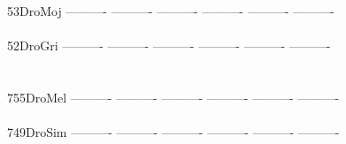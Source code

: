 \documentclass[11pt,twoside,reqno,a4paper]{article}
\begin{document}
{53\hspace*{3\charwidth}DroMoj	----------	----------	----------	----------	----------	----------	\\
\hspace*{5\charwidth}\hspace*{7\charwidth}\hspace*{1\charwidth}\hspace*{1\charwidth}\hspace*{1\charwidth}\hspace*{1\charwidth}\hspace*{1\charwidth}\hspace*{1\charwidth}\\
52\hspace*{3\charwidth}DroGri	----------	----------	----------	----------	----------	----------	\\
\hspace*{5\charwidth}\hspace*{7\charwidth}\hspace*{1\charwidth}\hspace*{1\charwidth}\hspace*{1\charwidth}\hspace*{1\charwidth}\hspace*{1\charwidth}\hspace*{1\charwidth}\\
\\
755\hspace*{2\charwidth}DroMel	----------	----------	----------	----------	----------	----------	\\
\hspace*{5\charwidth}\hspace*{7\charwidth}\hspace*{1\charwidth}\hspace*{1\charwidth}\hspace*{1\charwidth}\hspace*{1\charwidth}\hspace*{1\charwidth}\hspace*{1\charwidth}\\
749\hspace*{2\charwidth}DroSim	----------	----------	----------	----------	----------	----------	\\
\hspace*{5\charwidth}\hspace*{7\charwidth}\hspace*{1\charwidth}\hspace*{1\charwidth}\hspace*{1\charwidth}\hspace*{1\charwidth}\hspace*{1\charwidth}\hspace*{1\charwidth}\\
}
\end{document}
